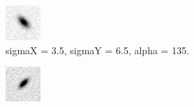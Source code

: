 \begin{figure}[!h]
\begin{subfigure}[t]{.23\textwidth}
        \includegraphics[width=\textwidth]{images/galaxyB.png}
        \caption{sigmaX = 3.5, sigmaY = 6.5, alpha = 135.}
        \label{fig:galaxyB}
    \end{subfigure}
    \begin{subfigure}[t]{.23\textwidth}
        \centering
        \includegraphics[width=\textwidth]{images/galaxyC.png}

\end{subfigure}
\end{figure}
